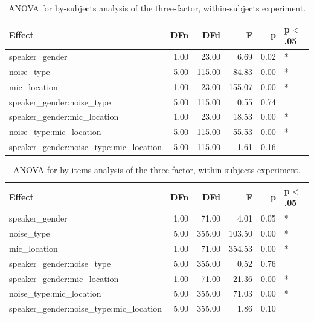 \documentclass[dissertation,copyright]{uathesis}
\begin{document}
\begin{table}[ht]
\centering
\begin{tabular}{lrrrrl}
  \hline
Effect & DFn & DFd & F & p & p$<$.05 \\ 
  \hline
speaker\_gender & 1.00 & 23.00 & 6.69 & 0.02 & * \\ 
  noise\_type & 5.00 & 115.00 & 84.83 & 0.00 & * \\ 
  mic\_location & 1.00 & 23.00 & 155.07 & 0.00 & * \\ 
  speaker\_gender:noise\_type & 5.00 & 115.00 & 0.55 & 0.74 &  \\ 
  speaker\_gender:mic\_location & 1.00 & 23.00 & 18.53 & 0.00 & * \\ 
  noise\_type:mic\_location & 5.00 & 115.00 & 55.53 & 0.00 & * \\ 
  speaker\_gender:noise\_type:mic\_location & 5.00 & 115.00 & 1.61 & 0.16 &  \\ 
   \hline
\end{tabular}
\caption{ANOVA for by-subjects analysis of the three-factor, within-subjects experiment.} 
\label{tab:anova1_by_subj}
\end{table}
\begin{table}[ht]
\centering
\begin{tabular}{lrrrrl}
  \hline
Effect & DFn & DFd & F & p & p$<$.05 \\ 
  \hline
speaker\_gender & 1.00 & 71.00 & 4.01 & 0.05 & * \\ 
  noise\_type & 5.00 & 355.00 & 103.50 & 0.00 & * \\ 
  mic\_location & 1.00 & 71.00 & 354.53 & 0.00 & * \\ 
  speaker\_gender:noise\_type & 5.00 & 355.00 & 0.52 & 0.76 &  \\ 
  speaker\_gender:mic\_location & 1.00 & 71.00 & 21.36 & 0.00 & * \\ 
  noise\_type:mic\_location & 5.00 & 355.00 & 71.03 & 0.00 & * \\ 
  speaker\_gender:noise\_type:mic\_location & 5.00 & 355.00 & 1.86 & 0.10 &  \\ 
   \hline
\end{tabular}
\caption{ANOVA for by-items analysis of the three-factor, within-subjects experiment.} 
\label{tab:anova1_by_item}
\end{table}
\end{document}
